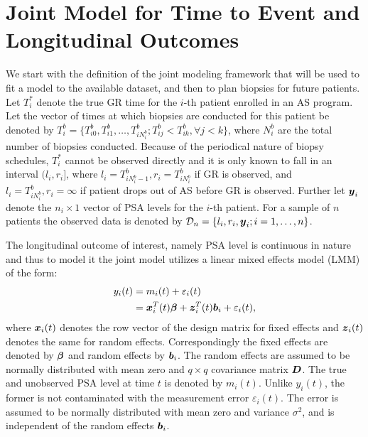 
\section{Joint Model for Time to Event and Longitudinal Outcomes}
\label{web_sec : jm_framework}
We start with the definition of the joint modeling framework that will be used to fit a model to the available dataset, and then to plan biopsies for future patients. Let $T_i^*$ denote the true GR time for the $i$-th patient enrolled in an AS program. Let the vector of times at which biopsies are conducted for this patient be denoted by $T_i^b = \{T^b_{i0}, T^b_{i1}, \ldots, T^b_{i{N_i^b}}; T^b_{ij} < T^b_{ik}, \forall j<k\}$, where $N_i^b$ are the total number of biopsies conducted. Because of the periodical nature of biopsy schedules, $T_i^*$ cannot be observed directly and it is only known to fall in an interval $(l_i, r_i]$, where $l_i = T^b_{i{N_i^b - 1}}, r_i = T^b_{i{N_i^b}}$ if GR is observed, and $l_i = T^b_{i{N_i^b}}, r_i=\infty$ if patient drops out of AS before GR is observed. Further let $\boldsymbol{y}_i$ denote the $n_i \times 1$  vector of PSA levels for the $i$-th patient. For a sample of $n$ patients the observed data is denoted by $\mathcal{D}_n = \{l_i, r_i, \boldsymbol{y}_i; i = 1, \ldots, n\}$.

The longitudinal outcome of interest, namely PSA level is continuous in nature and thus to model it the joint model utilizes a linear mixed effects model (LMM) of the form:
\begin{equation*}
\begin{split}
y_i(t) &= m_i(t) + \varepsilon_i(t)\\
&=\boldsymbol{x}_i^T(t) \boldsymbol{\beta} + \boldsymbol{z}_i^T(t) \boldsymbol{b}_i + \varepsilon_i(t),
\end{split}
\end{equation*}
where $\boldsymbol{x}_i(t)$ denotes the row vector of the design matrix for fixed effects and $\boldsymbol{z}_i(t)$ denotes the same for random effects. Correspondingly the fixed effects are denoted by $\boldsymbol{\beta}$ and random effects by $\boldsymbol{b}_i$. The random effects are assumed to be normally distributed with mean zero and $q \times q$ covariance matrix $\boldsymbol{D}$. The true and unobserved PSA level at time $t$ is denoted by $m_i(t)$. Unlike $y_i(t)$, the former is not contaminated with the measurement error $\varepsilon_i(t)$. The error is assumed to be normally distributed with mean zero and variance $\sigma^2$, and is independent of the random effects $\boldsymbol{b}_i$.


